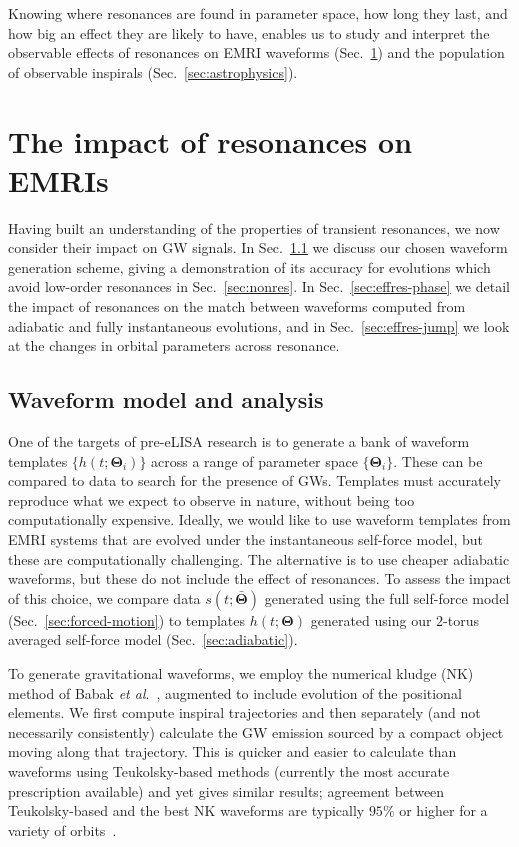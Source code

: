 \documentclass[aps,prd,amsfonts,amssymb,amsmath,nofootinbib,showpacs,superscriptaddress,twocolumn]{revtex4}
\newcommand{\secref}[1]{Sec.~\ref{sec:#1}}
\begin{document}
Knowing where resonances are found in parameter space, how long they last, and how big an effect they are likely to have, enables us to study and interpret the observable effects of resonances on EMRI waveforms (\secref{waveforms}) and the population of observable inspirals (\secref{astrophysics}).


\section{The impact of resonances on EMRIs}
\label{sec:waveforms}

Having built an understanding of the properties of transient resonances, we now consider their impact on GW signals. In \secref{kludge} we discuss our chosen waveform generation scheme, giving a demonstration of its accuracy for evolutions which avoid low-order resonances in \secref{nonres}. In \secref{effres-phase} we detail the impact of resonances on the match between waveforms computed from adiabatic and fully instantaneous evolutions, and in \secref{effres-jump} we look at the changes in orbital parameters across resonance.

\subsection{Waveform model and analysis}
\label{sec:kludge}

One of the targets of pre-eLISA research is to generate a bank of waveform templates $\{h(t;\boldsymbol{\Theta}_i)\}$ across a range of parameter space $\{\boldsymbol{\Theta}_i\}$. These can be compared to data to search for the presence of GWs. Templates must accurately reproduce what we expect to observe in nature, without being too computationally expensive. Ideally, we would like to use waveform templates from EMRI systems that are evolved under the instantaneous self-force model, but these are computationally challenging. The alternative is to use cheaper adiabatic waveforms, but these do not include the effect of resonances. To assess the impact of this choice, we compare data $s(t;\bar{\boldsymbol{\Theta}})$ generated using the full self-force model (\secref{forced-motion}) to templates $h(t;\boldsymbol{\Theta})$ generated using our $2$-torus averaged self-force model (\secref{adiabatic}).

To generate gravitational waveforms, we employ the numerical kludge (NK) method of Babak {\it{et al}}.~\cite{Babak2007}, augmented to include evolution of the positional elements. We first compute inspiral trajectories and then separately (and not necessarily consistently) calculate the GW emission sourced by a compact object moving along that trajectory. This is quicker and easier to calculate than waveforms using Teukolsky-based methods (currently the most accurate prescription available) and yet gives similar results; agreement between Teukolsky-based and the best NK waveforms are typically $95\%$ or higher for a variety of orbits~\cite{Babak2007, Berry2013}.
\end{document}
